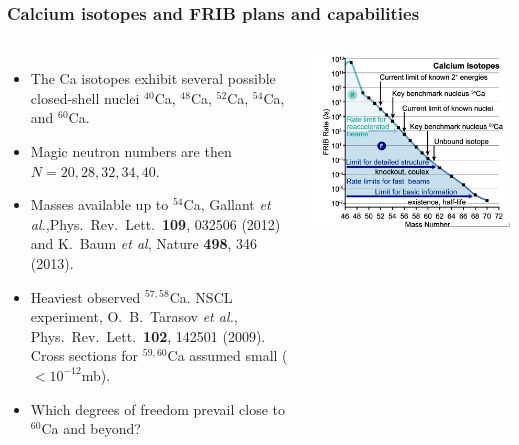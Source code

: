 \documentclass[compress]{beamer}
\begin{document}
\frame
    {
      \frametitle{Calcium isotopes and FRIB plans and capabilities}
      \begin{footnotesize}
     \begin{columns}
      \column{5.0cm}
\begin{itemize}
\item The Ca  isotopes exhibit several possible closed-shell nuclei $^{40}$Ca, $^{48}$Ca, $^{52}$Ca, $^{54}$Ca,
and  $^{60}$Ca. 
\item  Magic neutron numbers are then $N=20, 28, 32, 34, 40$. 
\item Masses available up to $^{54}$Ca, Gallant {\em et al.},Phys.~Rev.~Lett.~{\bf 109}, 032506 (2012) and K.~Baum {\em et al}, Nature {\bf 498}, 346 (2013).
\item Heaviest observed $^{57,58}$Ca. NSCL experiment,  O.~B.~Tarasov {\it et al.}, Phys.~Rev.~Lett.~{\bf 102}, 142501 (2009). Cross sections for $^{59,60}$Ca assumed small ($< 10^{-12}$mb).
\item Which degrees of freedom prevail close to $^{60}$Ca and beyond?
\end{itemize}
\column{6cm}
      \begin{center}
	\includegraphics[width=1.15\textwidth]{careach.png}
      \end{center}
\end{columns}
      \end{footnotesize}
    }
\frame
\end{document}
